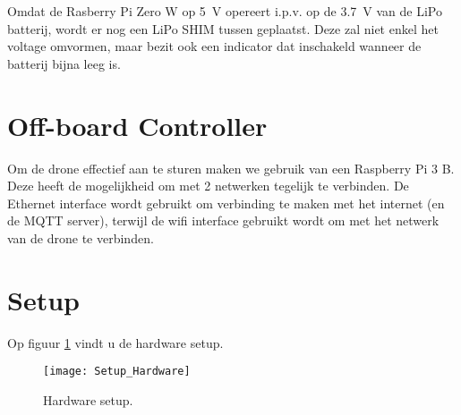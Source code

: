 Omdat de Rasberry Pi Zero W op \SI{5}{\V} opereert i.p.v. op de \SI{3.7}{\V} van de LiPo batterij, wordt er nog een LiPo SHIM tussen geplaatst. Deze zal niet enkel het voltage omvormen, maar bezit ook een indicator dat inschakeld wanneer de batterij bijna leeg is.

\section{Off-board Controller} \label{sec:offboard_controller}
Om de drone effectief aan te sturen maken we gebruik van een Raspberry Pi 3 B. Deze heeft de mogelijkheid om met 2 netwerken tegelijk te verbinden. De Ethernet interface wordt gebruikt om verbinding te maken met het internet (en de MQTT server), terwijl de wifi interface gebruikt wordt om met het netwerk van de drone te verbinden.

\section{Setup} \label{sec:setup_hardware}
Op figuur \ref{fig:setup_hardware} vindt u de hardware setup.
\begin{figure}[p]
	\centering
	\texttt{[image: Setup\_Hardware]}
	\caption[Hardware setup]{Hardware setup.}
	\label{fig:setup_hardware}
\end{figure}